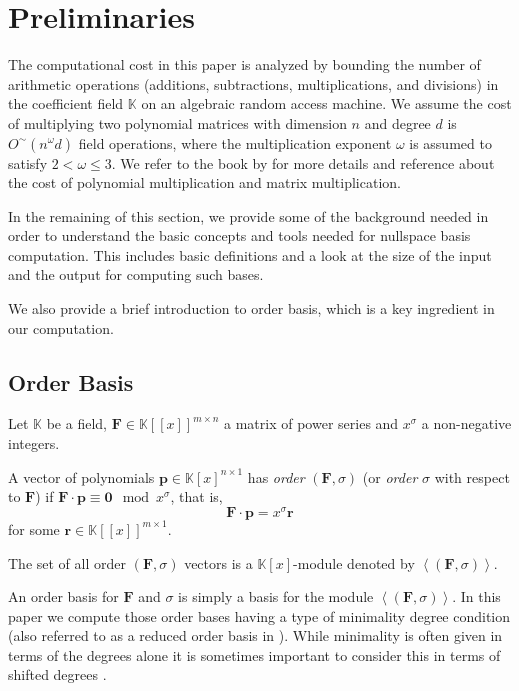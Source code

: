 
\section{Preliminaries}

\label{sec:Background}

The computational cost in this paper is analyzed by bounding the number
of arithmetic operations (additions, subtractions, multiplications,
and divisions) in the coefficient field $\mathbb{K}$ on an algebraic
random access machine. We assume the cost of multiplying two polynomial
matrices with dimension $n$ and degree $d$ is $O^{\sim}(n^{\omega}d)$
field operations, where the multiplication exponent $\omega$ is assumed
to satisfy $2<\omega\le3$. We refer to the book by \citet{vonzurgathen}
for more details and reference about the cost of polynomial multiplication
and matrix multiplication.

In the remaining of this section, we provide some of the background
needed in order to understand the basic concepts and tools needed
for nullspace basis computation. This includes basic definitions and
a look at the size of the input and the output for computing such
bases.%
\begin{comment}
, which provide lower bounds for the computational cost 
\end{comment}
{} We also provide a brief introduction to order basis, which is a key
ingredient in our computation. 


\subsection{Order Basis}

Let $\mathbb{K}$ be a field, $\mathbf{F}\in\mathbb{K}\left[\left[x\right]\right]^{m\times n}$
a matrix of power series and $x^{\sigma}$ a non-negative integers. 
\begin{defn}
A vector of polynomials $\mathbf{p}\in\mathbb{K}\left[x\right]^{n\times1}$
has \emph{order} $\left(\mathbf{F},\sigma\right)$ (or \emph{order}
$\sigma$ with respect to $\mathbf{F}$) if $\mathbf{F}\cdot\mathbf{p}\equiv\mathbf{0}\mod x^{\sigma}$,
that is, 
\[
\mathbf{F}\cdot\mathbf{p}=x^{\sigma}\mathbf{r}
\]
 for some $\mathbf{r}\in\mathbb{K}\left[\left[x\right]\right]^{m\times1}$.
\begin{comment}
The vector of power series $\mathbf{r}$ is called the order $\left(\mathbf{F},\sigma\right)$-residual
of \textbf{$\mathbf{p}$}. 
\end{comment}
{} The set of all order $\left(\mathbf{F},\sigma\right)$ vectors is
a $\mathbb{K}\left[x\right]$-module denoted by $\left\langle \left(\mathbf{F},\sigma\right)\right\rangle $. 
\end{defn}
An order basis for $\mathbf{F}$ and $\sigma$ is simply a basis for
the module $\left\langle \left(\mathbf{F},\sigma\right)\right\rangle $.
In this paper we compute those order bases having a type of minimality
degree condition (also referred to as a reduced order basis in \citep{BL1997}).
While minimality is often given in terms of the degrees alone it is
sometimes important to consider this in terms of shifted degrees \citep{BLV:jsc06}.

